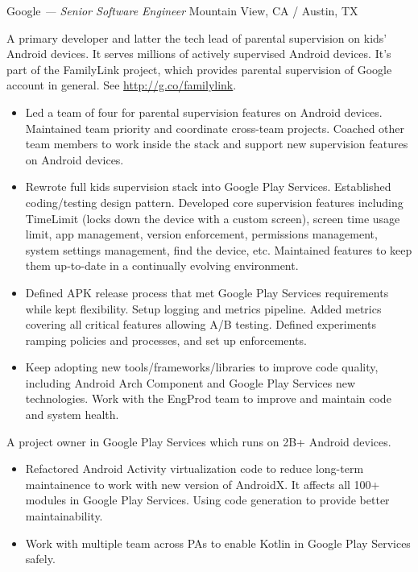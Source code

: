 \documentclass[]{friggeri-cv} %
\begin{document}
\begin{entrylist}
  {Google \emph{--- Senior Software Engineer}}
  {Mountain View, CA / Austin, TX}
  {
    A primary developer and latter the tech lead of parental supervision on kids' Android devices.
    It serves millions of actively supervised Android devices.
    It's part of the FamilyLink project, which provides parental supervision of Google account in general.
    See \url{http://g.co/familylink}.
    \begin{itemize}
      \item Led a team of four for parental supervision features on Android devices.
      Maintained team priority and coordinate cross-team projects.
      Coached other team members to work inside the stack and support new supervision features on Android devices.
      \item Rewrote full kids supervision stack into Google Play Services.
      Established coding/testing design pattern.
      Developed core supervision features including TimeLimit (locks down the device with a custom screen),
      screen time usage limit, app management, version enforcement, permissions management, system settings management, find the device, etc.
      Maintained features to keep them up-to-date in a continually evolving environment.
      \item Defined APK release process that met Google Play Services requirements while kept flexibility.
      Setup logging and metrics pipeline.
      Added metrics covering all critical features allowing A/B testing.
      Defined experiments ramping policies and processes, and set up enforcements.
      \item Keep adopting new tools/frameworks/libraries to improve code quality,
      including Android Arch Component and Google Play Services new technologies.
      Work with the EngProd team to improve and maintain code and system health.
    \end{itemize}
    A project owner in Google Play Services which runs on 2B+ Android devices.
    \begin{itemize}
      \item Refactored Android Activity virtualization code to reduce long-term maintainence to work with new version of AndroidX.
      It affects all 100+ modules in Google Play Services.
      Using code generation to provide better maintainability.
      \item Work with multiple team across PAs to enable Kotlin in Google Play Services safely.

\end{itemize}}
\end{entrylist}
\end{document}
